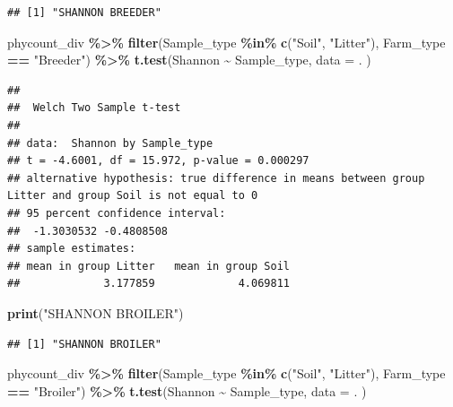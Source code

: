 \documentclass[
]{article}
\newenvironment{Shaded}{\begin{snugshade}}{\end{snugshade}}
\newcommand{\AttributeTok}[1]{\textcolor[rgb]{0.13,0.29,0.53}{#1}}
\newcommand{\FunctionTok}[1]{\textcolor[rgb]{0.13,0.29,0.53}{\textbf{#1}}}
\newcommand{\NormalTok}[1]{#1}
\newcommand{\SpecialCharTok}[1]{\textcolor[rgb]{0.81,0.36,0.00}{\textbf{#1}}}
\newcommand{\StringTok}[1]{\textcolor[rgb]{0.31,0.60,0.02}{#1}}
\begin{document}
\begin{verbatim}
## [1] "SHANNON BREEDER"
\end{verbatim}

\begin{Shaded}
\begin{Highlighting}[]
\NormalTok{phycount\_div }\SpecialCharTok{\%\textgreater{}\%}
  \FunctionTok{filter}\NormalTok{(Sample\_type }\SpecialCharTok{\%in\%} \FunctionTok{c}\NormalTok{(}\StringTok{"Soil"}\NormalTok{, }\StringTok{"Litter"}\NormalTok{),}
\NormalTok{         Farm\_type }\SpecialCharTok{==} \StringTok{"Breeder"}\NormalTok{) }\SpecialCharTok{\%\textgreater{}\%}
  \FunctionTok{t.test}\NormalTok{(Shannon }\SpecialCharTok{\textasciitilde{}}\NormalTok{ Sample\_type, }
       \AttributeTok{data =}\NormalTok{ .}
\NormalTok{       )}
\end{Highlighting}
\end{Shaded}

\begin{verbatim}
## 
##  Welch Two Sample t-test
## 
## data:  Shannon by Sample_type
## t = -4.6001, df = 15.972, p-value = 0.000297
## alternative hypothesis: true difference in means between group Litter and group Soil is not equal to 0
## 95 percent confidence interval:
##  -1.3030532 -0.4808508
## sample estimates:
## mean in group Litter   mean in group Soil 
##             3.177859             4.069811
\end{verbatim}

\begin{Shaded}
\begin{Highlighting}[]
\FunctionTok{print}\NormalTok{(}\StringTok{"SHANNON BROILER"}\NormalTok{)}
\end{Highlighting}
\end{Shaded}

\begin{verbatim}
## [1] "SHANNON BROILER"
\end{verbatim}

\begin{Shaded}
\begin{Highlighting}[]
\NormalTok{phycount\_div }\SpecialCharTok{\%\textgreater{}\%}
  \FunctionTok{filter}\NormalTok{(Sample\_type }\SpecialCharTok{\%in\%} \FunctionTok{c}\NormalTok{(}\StringTok{"Soil"}\NormalTok{, }\StringTok{"Litter"}\NormalTok{),}
\NormalTok{         Farm\_type }\SpecialCharTok{==} \StringTok{"Broiler"}\NormalTok{) }\SpecialCharTok{\%\textgreater{}\%}
  \FunctionTok{t.test}\NormalTok{(Shannon }\SpecialCharTok{\textasciitilde{}}\NormalTok{ Sample\_type, }
       \AttributeTok{data =}\NormalTok{ .}
\NormalTok{       )}
\end{Highlighting}
\end{Shaded}
\end{document}
